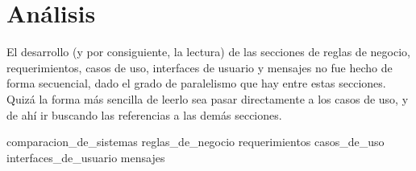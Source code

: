 %
%

\section{Análisis}

El desarrollo (y por consiguiente, la lectura) de las secciones de reglas de
negocio, requerimientos, casos de uso, interfaces de usuario y mensajes no fue
hecho de forma secuencial, dado el grado de paralelismo que hay entre estas
secciones. Quizá la forma más sencilla de leerlo sea pasar directamente a los
casos de uso, y de ahí ir buscando las referencias a las demás secciones.

{comparacion_de_sistemas}
{reglas_de_negocio}
{requerimientos}
{casos_de_uso}
{interfaces_de_usuario}
{mensajes}

